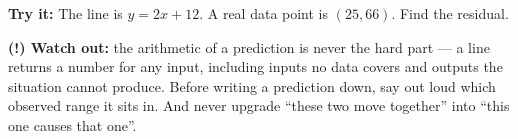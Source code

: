 \documentclass[12pt]{article}
\begin{document}
\begin{tryitbox}
\textbf{Try it:} \quad The line is $y = 2x + 12$. A real data point is $(25, 66)$. Find
the residual.\\[2pt]
\end{tryitbox}

\begin{watchoutbox}
\textbf{(!) Watch out:} the arithmetic of a prediction is never the hard part --- a line
returns a number for any input, including inputs no data covers and outputs the situation
cannot produce. Before writing a prediction down, say out loud which observed range it
sits in. And never upgrade ``these two move together'' into ``this one causes that one''.
\end{watchoutbox}
\end{document}
